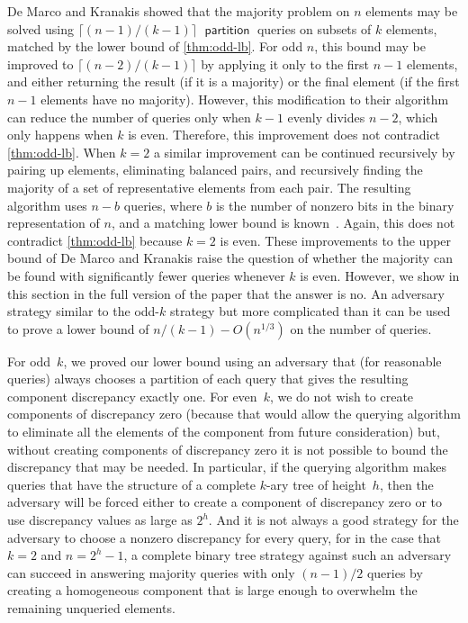 \documentclass[11pt]{llncs}
\newcommand{\qpart}{\operatorname{\mathsf{partition}}}
\begin{document}
De Marco and Kranakis showed that the majority problem on $n$ elements may be solved using $\lceil (n-1)/(k-1)\rceil$ $\qpart$ queries on subsets of $k$ elements, matched by the lower bound of \autoref{thm:odd-lb}. For odd $n$, this bound may be improved to $\lceil (n-2)/(k-1)\rceil$ by applying it only to the first $n-1$ elements, and either returning the result (if it is a majority) or the final element (if the first $n-1$ elements have no majority). However, this modification to their algorithm can reduce the number of queries only when $k-1$ evenly divides $n-2$, which only happens when $k$ is even. Therefore, this improvement does not contradict \autoref{thm:odd-lb}.
When $k=2$ a similar improvement can be continued recursively by pairing up elements, eliminating balanced pairs, and recursively finding the majority of a set of representative elements from each pair. The resulting algorithm uses $n-b$ queries, where $b$ is the number of nonzero bits in the binary representation of $n$, and a matching lower bound is known~\cite{SakWer-Comb-91}. Again, this does not contradict \autoref{thm:odd-lb} because $k=2$ is even.
These improvements to the upper bound of De Marco and Kranakis raise the question of whether the majority can be found with significantly fewer queries whenever $k$ is even. However, we show
\ifFull
in this section
\else
in the full version of the paper
\fi
that the answer is no. An adversary strategy similar to the odd-$k$ strategy but more complicated than it can be used to prove a lower bound of $n/(k-1)-O(n^{1/3})$ on the number of queries.
\ifFull

For odd~$k$, we proved our lower bound using an adversary that (for reasonable queries) always chooses a partition of each query that gives the resulting component discrepancy exactly one. For even~$k$, we do not wish to create components of discrepancy zero (because that would allow the querying algorithm to eliminate all the elements of the component from future consideration) but, without creating components of discrepancy zero it is not possible to bound the discrepancy that may be needed. In particular, if the querying algorithm makes queries that have the structure of a complete $k$-ary tree of height~$h$, then the adversary will be forced either to create a component of discrepancy zero or to use discrepancy values as large as $2^h$. And it is not always a good strategy for the adversary to choose a nonzero discrepancy for every query, for in the case that $k=2$ and $n=2^h-1$, a complete binary tree strategy against such an adversary can succeed in answering majority queries with only $(n-1)/2$ queries by creating a homogeneous component that is large enough to overwhelm the remaining unqueried elements.
\end{document}
